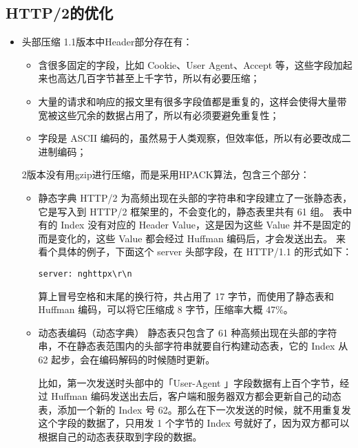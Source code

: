 \documentclass[11pt]{article}
\begin{document}
\subsection{HTTP/2的优化}
\label{sec:orgee16560}
\begin{itemize}
\item 头部压缩
1.1版本中Header部分存在有：
\begin{itemize}
\item 含很多固定的字段，比如 Cookie、User Agent、Accept 等，这些字段加起来也高达几百字节甚至上千字节，所以有必要压缩；
\item 大量的请求和响应的报文里有很多字段值都是重复的，这样会使得大量带宽被这些冗余的数据占用了，所以有必须要避免重复性；
\item 字段是 ASCII 编码的，虽然易于人类观察，但效率低，所以有必要改成二进制编码；
\end{itemize}
2版本没有用gzip进行压缩，而是采用HPACK算法，包含三个部分：
\begin{itemize}
\item 静态字典
HTTP/2 为高频出现在头部的字符串和字段建立了一张静态表，它是写入到 HTTP/2 框架里的，不会变化的，静态表里共有 61 组。
表中有的 Index 没有对应的 Header Value，这是因为这些 Value 并不是固定的而是变化的，这些 Value 都会经过 Huffman 编码后，才会发送出去。
来看个具体的例子，下面这个 server 头部字段，在 HTTP/1.1 的形式如下：
\begin{verbatim}
server: nghttpx\r\n
\end{verbatim}
算上冒号空格和末尾的换行符，共占用了 17 字节，而使用了静态表和 Huffman 编码，可以将它压缩成 8 字节，压缩率大概 47\%。
\item 动态表编码（动态字典）
静态表只包含了 61 种高频出现在头部的字符串，不在静态表范围内的头部字符串就要自行构建动态表，它的 Index 从 62 起步，会在编码解码的时候随时更新。

比如，第一次发送时头部中的「User-Agent 」字段数据有上百个字节，经过 Huffman 编码发送出去后，客户端和服务器双方都会更新自己的动态表，添加一个新的 Index 号 62。那么在下一次发送的时候，就不用重复发这个字段的数据了，只用发 1 个字节的 Index 号就好了，因为双方都可以根据自己的动态表获取到字段的数据。


\end{itemize}
\end{itemize}
\end{document}
